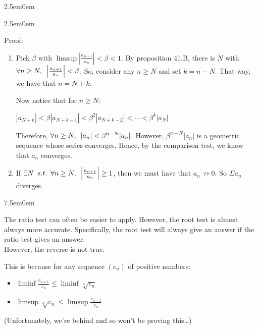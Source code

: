\documentclass{book}
\newcommand{\hThree}{%
   \color{PineGreen}
   \fontsize{13}{15}\selectfont%
}
\newcommand{\teachComment}{
   \color{Orange}%
   \fontsize{12}{14}\selectfont%
}
\newenvironment{myIndent}{%
   \begin{adjustwidth}{2.5em}{0em}%
}{%
   \end{adjustwidth}%
}
\newenvironment{myTindent}{%
   \begin{adjustwidth}{7.5em}{0em}%
}{%
   \end{adjustwidth}%
}
\newcommand{\retTwo}{\hfill\bigbreak}
\newcommand{\suchthat}{ \hspace{0.5em}s.t.\hspace{0.5em}}
\newcommand{\myHS}{ \hspace{0.5em}}
\begin{document}
{\begin{myIndent}
         {\begin{myIndent} \hThree
            Proof:
            \begin{enumerate}
               \item Pick $\beta$ with $\limsup{\left|\frac{a_{n+1}}{a_n}\right|} < \beta < 1$. By proposition 41.B, there is $N$ with $\forall n \geq N, \myHS \left| \frac{a_{n+1}}{a_n} \right| < \beta$. So, consider any $n \geq N$ and set $k = n - N$. That way, we have that $n = N + k$. \retTwo
               
               Now notice that for $n \geq N$:
               
               {\center $|a_{N+k}| < \beta |a_{N+k-1}| < \beta^2 |a_{N+k-2}| < \cdots < \beta^k |a_{N}| $ \retTwo\par}
               
               Therefore, $\forall n \geq N, \myHS |a_n| < \beta^{n-N}|a_n|$. However, $\beta^{n-N}|a_n|$ is a geometric sequence whose series converges. Hence, by the comparison test, we know that $a_n$ converges. \retTwo

               \item If $\exists N \suchthat \forall n \geq N, \myHS \left|\frac{a_{n+1}}{a_n}\right| \geq 1$, then we must have that $a_n \not\rightarrow 0$. So $\Sigma a_n$ diverges. \retTwo
            \end{enumerate}

            {\begin{myTindent} \teachComment
               The ratio test can often be easier to apply. However, the root test is almost always more accurate. Specifically, the root test will always give an answer if the ratio test gives an answer.\\ However, the reverse is not true. \retTwo

               This is because for any sequence $(c_n)$ of positive numbers:
               \begin{itemize}
                  \item $\liminf{\frac{c_{n+1}}{c_n}} \leq \liminf{\sqrt[n]{c_n}}$
                  \item $\limsup{\sqrt[n]{c_n}} \leq \limsup{\frac{c_{n+1}}{c_n}}$ \retTwo
               \end{itemize}
               (Unfortunately, we're behind and so won't be proving this\dots)
            \end{myTindent}}
         \end{myIndent}}
      \end{myIndent}}
\end{document}
